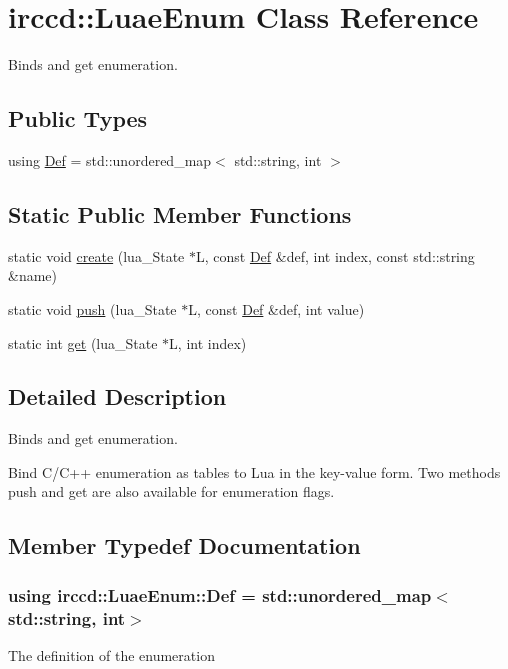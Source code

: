 \hypertarget{a00042}{\section{irccd\-:\-:Luae\-Enum Class Reference}
\label{a00042}
}


Binds and get enumeration.  


\subsection*{Public Types}
\begin{DoxyCompactItemize}
\item 
using \hyperlink{a00042_a59847f318aaefd6e95682d2339100311}{Def} = std\-::unordered\-\_\-map$<$ std\-::string, int $>$
\end{DoxyCompactItemize}
\subsection*{Static Public Member Functions}
\begin{DoxyCompactItemize}
\item 
static void \hyperlink{a00042_af35037cb0d77e4558f0faff3e91e7832}{create} (lua\-\_\-\-State $\ast$L, const \hyperlink{a00042_a59847f318aaefd6e95682d2339100311}{Def} \&def, int index, const std\-::string \&name)
\item 
static void \hyperlink{a00042_a2edc1e78dc7e272b442683dbb0596a0b}{push} (lua\-\_\-\-State $\ast$L, const \hyperlink{a00042_a59847f318aaefd6e95682d2339100311}{Def} \&def, int value)
\item 
static int \hyperlink{a00042_ab82300bd04ac80120f9e82e2752346c1}{get} (lua\-\_\-\-State $\ast$L, int index)
\end{DoxyCompactItemize}


\subsection{Detailed Description}
Binds and get enumeration. 

Bind C/\-C++ enumeration as tables to Lua in the key-\/value form. Two methods push and get are also available for enumeration flags. 

\subsection{Member Typedef Documentation}
\hypertarget{a00042_a59847f318aaefd6e95682d2339100311}{
\subsubsection[{Def}]{\setlength{\rightskip}{0pt plus 5cm}using {\bf irccd\-::\-Luae\-Enum\-::\-Def} =  std\-::unordered\-\_\-map$<$std\-::string, int$>$}}\label{a00042_a59847f318aaefd6e95682d2339100311}
The definition of the enumeration 

